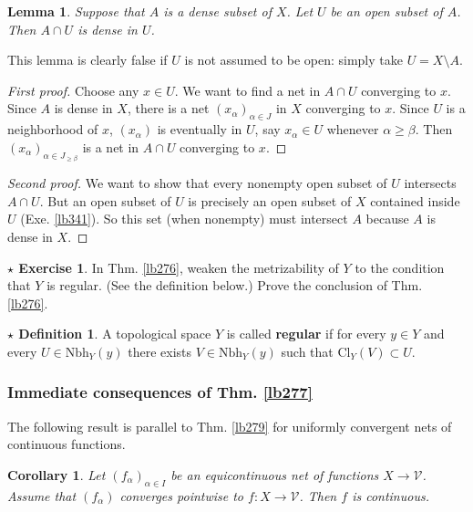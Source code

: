 \documentclass[12pt,b5paper,notitlepage]{article}
\theoremstyle{definition}
\newtheorem{sexe}[df]{$\star$ Exercise}
\newtheorem{sdf}[df]{$\star$ Definition}
\theoremstyle{plain}
\newtheorem{co}[df]{Corollary}
\newtheorem{lm}[df]{Lemma}
\newcommand{\mc}{\mathcal}
\newcommand{\Nbh}{\mathrm{Nbh}}
\newcommand{\Cl}{\mathrm{Cl}}
\numberwithin{equation}{section}
\begin{document}
\begin{lm}\label{lb342}
Suppose that $A$ is a dense subset of $X$. Let $U$ be an open subset of $A$. Then $A\cap U$ is dense in $U$.
\end{lm}

This lemma is clearly false if $U$ is not assumed to be open: simply take $U=X\setminus A$.

\begin{proof}[First proof]
Choose any $x\in U$. We want to find a net in $A\cap U$ converging to $x$. Since $A$ is dense in $X$, there is a net $(x_\alpha)_{\alpha\in J}$ in $X$ converging to $x$. Since $U$ is a neighborhood of $x$, $(x_\alpha)$ is eventually in $U$, say $x_\alpha\in U$ whenever $\alpha\geq\beta$. Then $(x_\alpha)_{\alpha\in J_{\geq \beta}}$ is a net in $A\cap U$ converging to $x$.
\end{proof}

\begin{proof}[Second proof]
We want to show that every nonempty open subset of $U$ intersects $A\cap U$. But an open subset of $U$ is precisely an open subset of $X$ contained inside $U$ (Exe. \ref{lb341}). So this set (when nonempty) must intersect $A$ because $A$ is dense in $X$.
\end{proof}



\begin{sexe}
In Thm. \ref{lb276}, weaken the metrizability of $Y$ to the condition that $Y$ is regular. (See the definition below.) Prove the conclusion of Thm. \ref{lb276}.
\end{sexe}

\begin{sdf}
A topological space $Y$ is called \textbf{regular}  if for every $y\in Y$ and every $U\in\Nbh_Y(y)$ there exists $V\in\Nbh_Y(y)$ such that $\Cl_Y(V)\subset U$.
\end{sdf}



\subsubsection{Immediate consequences of Thm. \ref{lb277}}

The following result is parallel to Thm. \ref{lb279} for uniformly convergent nets of continuous functions.

\begin{co}\label{lb303}
Let $(f_\alpha)_{\alpha\in I}$ be an equicontinuous net of functions $X\rightarrow\mc V$. Assume that $(f_\alpha)$ converges pointwise to $f:X\rightarrow\mc V$. Then $f$ is continuous.
\end{co}
\end{document}
